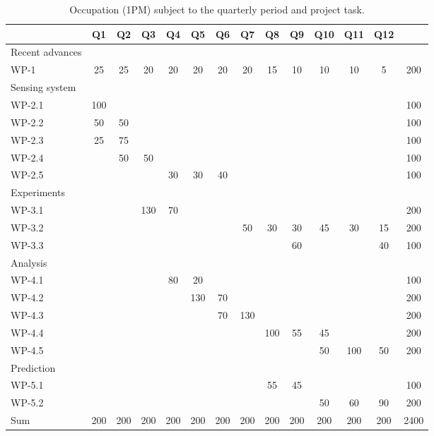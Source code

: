 \documentclass[12pt]{article}
\begin{document}
\begin{table}
\centering
\begin{footnotesize}
\begin{tabular}{|l||c|c|c|c|c|c|c|c|c|c|c|c||c|}
 \hline
	& Q1	&Q2	&Q3	&Q4	&Q5	&Q6	&Q7	&Q8	&Q9	&Q10	&Q11	&Q12	&\\\hline\hline
Recent advances& &	&	&	&	&	&	&	&	&	&	& 	&\\
WP-1	&25	&25	&20	&20	&20	&20	&20	&15	&10	&10	&10	&5 	& 200\\\hline
Sensing system& &	&	&	&	&	&	&	&	&	&	& 	&\\
WP-2.1	&100	&	&	&	&	&	&	&	&	&	&	& 	& 100\\
WP-2.2	&50	&50	&	&	&	&	&	&	&	&	&	& 	& 100\\
WP-2.3	&25	&75	&	&	&	&	&	&	&	&	&	& 	& 100\\
WP-2.4	&	&50	&50	&	&	&	&	&	&	&	&	& 	& 100\\
WP-2.5	&	&	&	&30	&30	&40	&	&	&	&	&	& 	& 100\\\hline
Experiments& &	&	&	&	&	&	&	&	&	&	&	&\\
WP-3.1	&	&	&130	&70	&	&	&	&	&	&	&	& 	& 200\\
WP-3.2	&	&	&	&	&	&	&50	&30	&30	&45	&30	&15 	& 200\\
WP-3.3	&	&	&	&	&	&	&	&	&60	&	&	&40 	& 100\\\hline
Analysis& &	&	&	&	&	&	&	&	&	&	& 	&\\
WP-4.1	&	&	&	&80	&20	&	&	&	&	&	&	& 	& 100\\
WP-4.2	&	&	&	&	&130	&70	&	&	&	&	&	& 	& 200\\
WP-4.3	&	&	&	&	&	&70	&130	&	&	&	&	& 	& 200\\
WP-4.4	&	&	&	&	&	&	&	&100	&55	&45	&	& 	& 200\\
WP-4.5	&	&	&	&	&	&	&	&	&	&50	&100	&50 	& 200\\\hline
Prediction& &	&	&	&	&	&	&	&	&	&	& &\\
WP-5.1	&	&	&	&	&	&	&	&55	 &45	&	&	&	& 100\\%
WP-5.2	&	&	&	&	&	&	&	&	 &	&50	&60	&90	& 200\\\hline
Sum	& 200	&200	&200	&200	&200	&200	&200	&200	 &200	&200	&200	&200	& 2400\\\hline
\end{tabular}
\end{footnotesize}
\caption{Occupation (1PM) subject to the quarterly period and project task.}
\label{tableGesamtueberblick}
\end{table}
\end{document}
